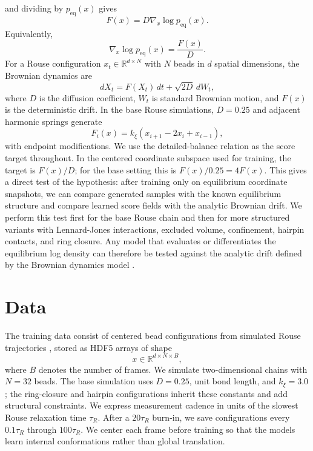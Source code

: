 \documentclass[reprint,amsmath,amssymb,aps,pra,10pt]{revtex4-2}
\begin{document}
and dividing by $p_{\mathrm{eq}}(x)$ gives
\begin{equation}
    F(x)
    =
    D\nabla_x\log p_{\mathrm{eq}}(x).
\end{equation}
Equivalently,
\begin{equation}
    \nabla_x\log p_{\mathrm{eq}}(x)
    =
    \frac{F(x)}{D}.
\end{equation}
For a Rouse configuration $x_t \in \mathbb{R}^{d \times N}$ with $N$ beads in $d$ spatial dimensions, the Brownian dynamics are
\begin{equation}
    dX_t = F(X_t)\,dt + \sqrt{2D}\,dW_t,
\end{equation}
where $D$ is the diffusion coefficient, $W_t$ is standard Brownian motion, and $F(x)$ is the deterministic drift.
In the base Rouse simulations, $D=0.25$ and adjacent harmonic springs generate
\begin{equation}
    F_i(x)
    =
    k_{\xi}
    \left(
        x_{i+1} - 2x_i + x_{i-1}
    \right),
\end{equation}
with endpoint modifications.
We use the detailed-balance relation as the score target throughout.
In the centered coordinate subspace used for training, the target is $F(x)/D$; for the base setting this is $F(x)/0.25=4F(x)$.
This gives a direct test of the hypothesis: after training only on equilibrium coordinate snapshots, we can compare generated samples with the known equilibrium structure and compare learned score fields with the analytic Brownian drift.
We perform this test first for the base Rouse chain and then for more structured variants with Lennard-Jones interactions, excluded volume, confinement, hairpin contacts, and ring closure.
Any model that evaluates or differentiates the equilibrium log density can therefore be tested against the analytic drift defined by the Brownian dynamics model \cite{noe2019,arts2023}.

\section{Data}

The training data consist of centered bead configurations from simulated Rouse trajectories \cite{rouse1953}, stored as HDF5 arrays of shape
\begin{equation}
    x \in \mathbb{R}^{d \times N \times B},
\end{equation}
where $B$ denotes the number of frames.
We simulate two-dimensional chains with $N=32$ beads.
The base simulation uses $D=0.25$, unit bond length, and $k_\xi=3.0$; the ring-closure and hairpin configurations inherit these constants and add structural constraints.
We express measurement cadence in units of the slowest Rouse relaxation time $\tau_R$.
After a $20\tau_R$ burn-in, we save configurations every $0.1\tau_R$ through $100\tau_R$.
We center each frame before training so that the models learn internal conformations rather than global translation.
\end{document}
